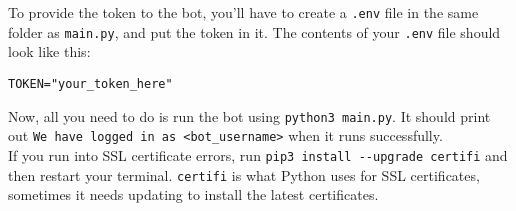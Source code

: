 \documentclass{article}
\begin{document}
To provide the token to the bot, you'll have to create a \verb|.env| file in the same folder as \verb|main.py|, and put the token in it. The contents of your \verb|.env| file should look like this: 

\begin{verbatim}
TOKEN="your_token_here"
\end{verbatim}

Now, all you need to do is run the bot using \verb|python3 main.py|. It should print out \verb|We have logged in as <bot_username>| when it runs successfully.\\

If you run into SSL certificate errors, run \verb|pip3 install --upgrade certifi| and then restart your terminal. \verb|certifi| is what Python uses for SSL certificates, sometimes it needs updating to install the latest certificates. \\
\end{document}
